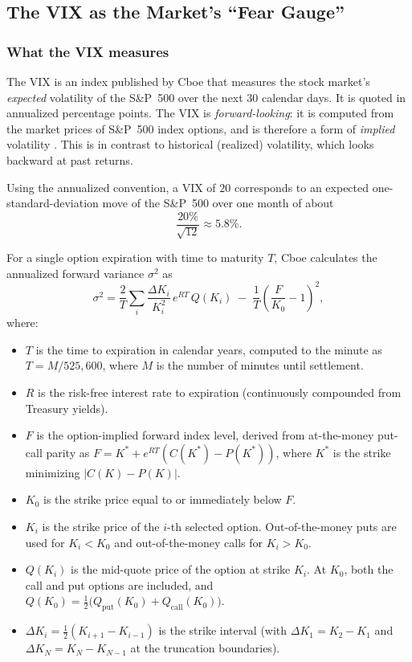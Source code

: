 
\subsection{The VIX as the Market's ``Fear Gauge''}
\subsubsection{What the VIX measures}

The VIX is an index published by Cboe that measures the stock market's \emph{expected} volatility of the S\&P~500 over the next 30 calendar days. It is quoted in annualized percentage points. The VIX is \emph{forward-looking}: it is computed from the market prices of S\&P~500 index options, and is therefore a form of \emph{implied} volatility \cite{cboewp}. This is in contrast to historical (realized) volatility, which looks backward at past returns. 

Using the annualized convention, a VIX of $20$ corresponds to an expected one-standard-deviation move of the S\&P~500 over one month of about
\begin{equation}
  \frac{20\%}{\sqrt{12}} \approx 5.8\%.
\end{equation}

For a single option expiration with time to maturity $T$, Cboe calculates the annualized forward variance $\sigma^2$ as
\begin{equation}
  \sigma^2 = \frac{2}{T}\sum_i \frac{\Delta K_i}{K_i^2}\,e^{RT}\,Q(K_i)\;-\;\frac{1}{T}\left(\frac{F}{K_0}-1\right)^{2},
  \label{eq:vix-term}
\end{equation}
where:
\begin{itemize}
  \item $T$ is the time to expiration in calendar years, computed to the minute as $T = M / 525{,}600$, where $M$ is the number of minutes until settlement.
  \item $R$ is the risk-free interest rate to expiration (continuously compounded from Treasury yields).
  \item $F$ is the option-implied forward index level, derived from at-the-money put-call parity as $F = K^* + e^{RT}(C(K^*) - P(K^*))$, where $K^*$ is the strike minimizing $|C(K) - P(K)|$.
  \item $K_0$ is the strike price equal to or immediately below $F$.
  \item $K_i$ is the strike price of the $i$-th selected option. Out-of-the-money puts are used for $K_i < K_0$ and out-of-the-money calls for $K_i > K_0$.
  \item $Q(K_i)$ is the mid-quote price of the option at strike $K_i$. At $K_0$, both the call and put options are included, and $Q(K_0) = \frac{1}{2}\big(Q_{\text{put}}(K_0) + Q_{\text{call}}(K_0)\big)$.
  \item $\Delta K_i = \frac{1}{2}(K_{i+1} - K_{i-1})$ is the strike interval (with $\Delta K_1 = K_2 - K_1$ and $\Delta K_N = K_N - K_{N-1}$ at the truncation boundaries).
\end{itemize}

